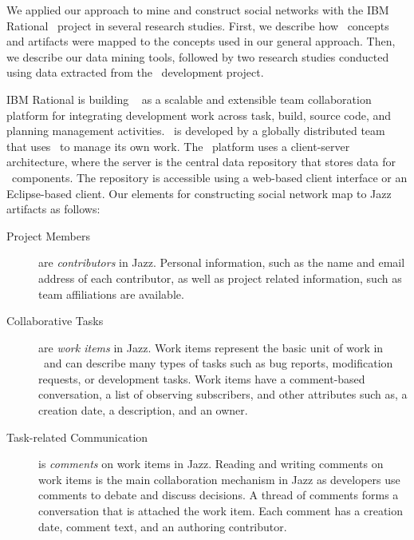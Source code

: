 We applied our approach to mine and construct social networks with the IBM
Rational \jazztm\ project in several research studies. First, we describe how
\jazztm\ concepts and artifacts were mapped to the concepts used in our general
approach. Then, we describe our data mining tools, followed by two research
studies conducted using data extracted from the \jazztm\ development project.

IBM Rational is building \jazztm\ \cite{frost:ieeesoftware:2007} as a scalable and
extensible team collaboration platform for integrating development work across
task, build, source code, and planning management activities. \jazztm\ is
developed by a globally distributed team that uses \jazztm\ to manage its own
work. The \jazztm\ platform uses a client-server architecture, where the server
is the central data repository that stores data for \jazztm\ components. The
repository is accessible using a web-based client interface or an Eclipse-based
client. Our elements for constructing social network map to Jazz artifacts as
follows:

\begin{description}
\item[Project Members] are \emph{contributors} in Jazz.
Personal information, such as the name and email address of each contributor, as well as
project related information, such as team affiliations are available.

\item[Collaborative Tasks] are \emph{work items} in Jazz. Work items represent
the basic unit of work in \jazztm\ and can describe many types of tasks such as
bug reports, modification requests, or development tasks. Work items have a
comment-based conversation, a list of observing subscribers, and other attributes
such as, a creation date, a description, and an owner.

\item[Task-related Communication] is \emph{comments} on work items in Jazz.
Reading and writing comments on work items is the main collaboration mechanism in
Jazz as developers use comments to debate and discuss decisions. A thread of
comments forms a conversation that is attached the work item. Each comment
has a creation date, comment text, and an authoring contributor.

\end{description}

